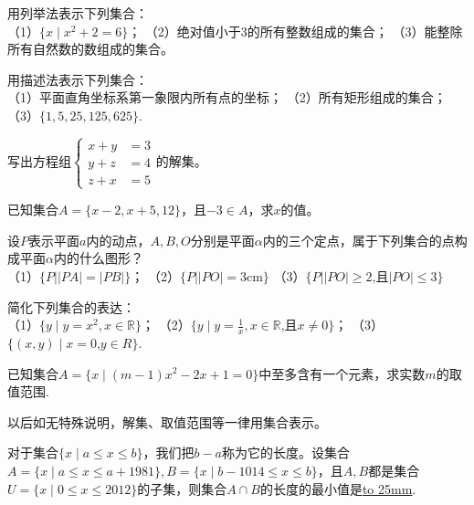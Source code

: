\documentclass[lang=cn,math=cm,chinesefont=nofont,11pt,scheme=chinese,onecol]{elegantbook}
\begin{document}
\begin{exercise}\label{exer:3}
  用列举法表示下列集合：\\
  （1）$\{x\mid x^2+2=6\}$；
  （2）绝对值小于3的所有整数组成的集合；
  （3）能整除所有自然数的数组成的集合。
\end{exercise}

\begin{exercise}\label{exer:4}
  用描述法表示下列集合：\\
  （1）平面直角坐标系第一象限内所有点的坐标；
  （2）所有矩形组成的集合；
  （3）$\{1,5,25,125,625\}$.
\end{exercise}

\begin{exercise}\label{exer:5}
  写出方程组$\left.\left\{\begin{aligned}x+y&=3\\y+z&=4\\z+x&=5\end{aligned}\right.\right.$的解集。
\end{exercise}

\begin{exercise}\label{exer:6}
  已知集合$A=\{x-2,x+5,12\}$，且$-3\in A$，求$x$的值。
\end{exercise}

\begin{exercise}\label{exer:7}
  设$P$表示平面$a$内的动点，$A,B,O$分别是平面$\alpha$内的三个定点，属于下列集合的点构成平面$\alpha$内的什么图形？\\
  （1）$\{P||PA|=|PB|\}$；
  （2）$\{P||PO|=3\text{cm}\}$
  （3）$\{P||PO|\geqslant2\text{,且}|PO|\leqslant3\}$
\end{exercise}

\begin{exercise}\label{exer:8}
  简化下列集合的表达：\\
  （1）$\{y\mid y=x^2,x\in\mathbb{R}\}$；
  （2）$\{y\mid y=\frac{1}{x},x\in\mathbb{R}\text{,且}x\neq0\}$；
  （3）$\{(x,y)\mid x=0\text{,}y\in R\}$.
\end{exercise}

\begin{exercise}\label{exer:9}
  已知集合$A=\{x\mid(m-1)x^2-2x+1=0\}$中至多含有一个元素，求实数$m$的取值范围.
\end{exercise}
\begin{remark}
  以后如无特殊说明，解集、取值范围等一律用集合表示。
\end{remark}

\begin{exercise}\label{exer:202406261951}
  对于集合$\{x\mid a\leq x\leq b\}$，我们把$b-a$称为它的长度。设集合$A=\{x\mid a\leq x\leq a+1981\},B=\{x\mid b-1014\leq x\leq b\}$，且$A,B$都是集合$U=\{x\mid 0\leq x\leq 2012\}$的子集，则集合$A\cap B$的长度的最小值是\underline{\hbox to 25mm{}}.
\end{exercise}
\end{document}
